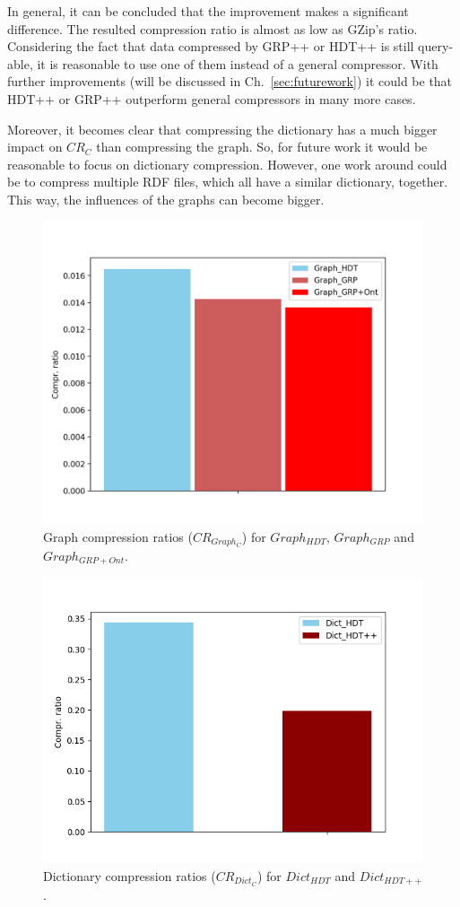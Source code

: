 In general, it can be concluded that the improvement makes a significant difference. The resulted compression ratio is almost as low as GZip's ratio. Considering the fact that data compressed by GRP++ or HDT++ is still query-able, it is reasonable to use one of them instead of a general compressor. With further improvements (will be discussed in Ch.~\ref{sec:futurework}) it could be that HDT++ or GRP++ outperform general compressors in many more cases.

Moreover, it becomes clear that compressing the dictionary has a much bigger impact on $CR_C$ than compressing the graph. So, for future work it would be reasonable to focus on dictionary compression. However, one work around could be to compress multiple RDF files, which all have a similar dictionary, together. This way, the influences of the graphs can become bigger.


\begin{figure}
	\centering
	\includegraphics[width=0.8\linewidth]{figures/4_evaluation/final/graphcompr}
	\caption{Graph compression ratios ($CR_{Graph_C}$) for $Graph_{HDT}$, $Graph_{GRP}$ and $Graph_{GRP+Ont}$.}
	\label{fig:graphcompr}
\end{figure}



\begin{figure}
	\centering
	\includegraphics[width=0.8\linewidth]{figures/4_evaluation/final/dictcompr}
	\caption{Dictionary compression ratios ($CR_{Dict_C}$) for $Dict_{HDT}$ and $Dict_{HDT++}$.}
	\label{fig:dictcompr}
\end{figure}





